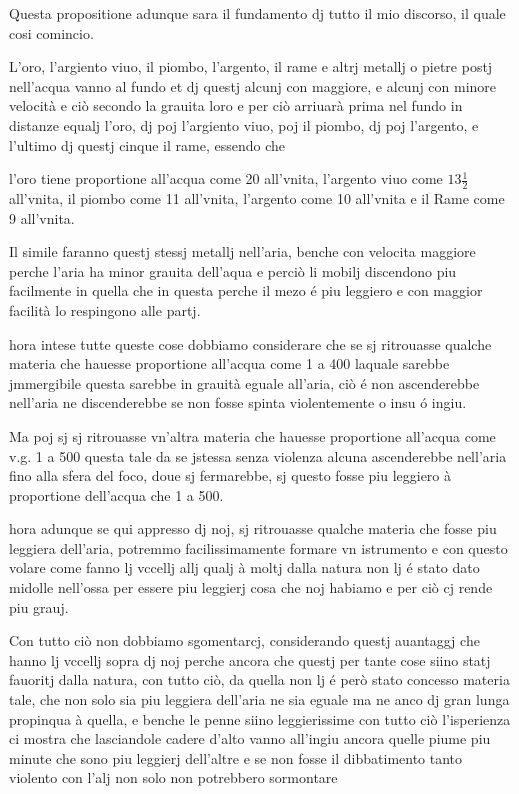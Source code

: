 \documentclass[11pt,a4paper]{article}
\begin{document}
Questa propositione adunque sara il fundamento dj tutto il mio discorso, il quale cosi comincio.

L'oro, l'argiento viuo, il piombo, l'argento, il rame e altrj metallj o pietre postj nell'acqua vanno al fundo et dj questj  alcunj con maggiore, e alcunj con minore velocità e ciò secondo la grauita loro e per ciò arriuarà prima nel fundo in distanze equalj l'oro, dj poj l'argiento viuo, poj il piombo, dj poj l'argento, e l'ultimo dj questj cinque il rame, essendo che


l'oro tiene proportione all'acqua come 20 all'vnita, l'argento viuo come $13\frac{1}{2}$ all'vnita, il piombo come 11 all'vnita, l'argento come 10 all'vnita e il Rame come 9 all'vnita.

Il simile faranno questj stessj metallj nell'aria, benche con velocita maggiore perche l'aria ha minor grauita dell'aqua e perciò li mobilj discendono piu facilmente in quella che in questa perche il mezo é piu leggiero e con maggior facilità lo respingono alle partj.

hora intese tutte queste cose dobbiamo considerare che se sj ritrouasse qualche materia che hauesse proportione all'acqua come 1 a 400 laquale sarebbe jmmergibile questa sarebbe in grauità eguale all'aria, ciò é non ascenderebbe nell'aria ne discenderebbe se non fosse spinta violentemente o insu ó ingiu.

Ma poj sj sj ritrouasse vn'altra materia che hauesse proportione all'acqua come v.g. 1 a 500 questa tale da se jstessa senza violenza alcuna ascenderebbe nell'aria fino alla sfera del foco, doue sj fermarebbe, sj questo fosse piu leggiero à proportione dell'acqua che 1 a 500.

hora adunque se qui appresso dj noj, sj ritrouasse qualche materia che fosse piu leggiera dell'aria, potremmo facilissimamente formare vn istrumento e con questo volare come fanno lj vccellj allj qualj à moltj dalla natura non lj é stato dato midolle nell'ossa per essere piu leggierj cosa che noj habiamo e per ciò cj rende piu grauj.

Con tutto ciò non dobbiamo sgomentarcj, considerando questj auantaggj che hanno lj vccellj sopra dj noj perche ancora che questj per tante cose siino statj fauoritj dalla natura, con tutto ciò, da quella non lj é però stato concesso materia tale, che non solo sia piu leggiera dell'aria ne sia eguale ma ne anco dj gran lunga propinqua à quella, e benche le penne siino leggierissime con tutto ciò l'isperienza ci mostra che lasciandole cadere d'alto vanno all'ingiu ancora quelle piume piu minute che sono piu leggierj dell'altre e se non fosse il dibbatimento tanto violento con l'alj non solo non potrebbero sormontare
\end{document}
